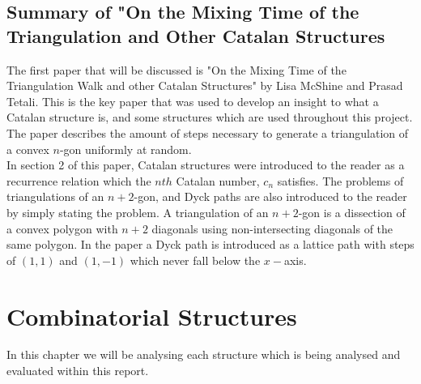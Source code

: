 \documentclass[12pt]{article}
\begin{document}
\subsection{Summary of "On the Mixing Time of the Triangulation and Other Catalan Structures}
The first paper that will be discussed is "On the Mixing Time of the Triangulation Walk and other Catalan Structures" by Lisa McShine and Prasad Tetali.\cite{McShine_onThe} This is the key paper that was used to develop an insight to what a Catalan structure is, and some structures which are used throughout this project. The paper describes the amount of steps necessary to generate a triangulation of a convex $n$-gon uniformly at random.\\
In section 2 of this paper, Catalan structures were introduced to the reader as a recurrence relation which the $nth$ Catalan number, $c_n$ satisfies. The problems of triangulations of an $n+2$-gon, and Dyck paths are also introduced to the reader by simply stating the problem. A triangulation of an $n+2$-gon is a dissection of a convex polygon with $n+2$ diagonals using non-intersecting diagonals of the same polygon. In the paper a Dyck path is introduced as a lattice path with steps of $(1,1)$ and $(1,-1)$ which never fall below the $x-$axis. 

\section{Combinatorial Structures}
In this chapter we will be analysing each structure which is being analysed and evaluated within this report.

\end{document}
